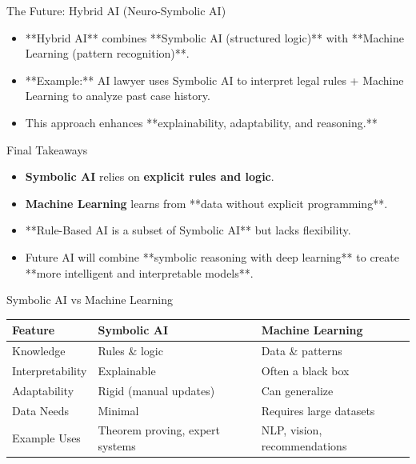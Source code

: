 \documentclass{beamer}
\begin{document}
\begin{frame}{The Future: Hybrid AI (Neuro-Symbolic AI)}
    \begin{itemize}
        \item **Hybrid AI** combines **Symbolic AI (structured logic)** with **Machine Learning (pattern recognition)**.
        \item **Example:** AI lawyer uses Symbolic AI to interpret legal rules + Machine Learning to analyze past case history.
        \item This approach enhances **explainability, adaptability, and reasoning.**
    \end{itemize}
\end{frame}

\begin{frame}{Final Takeaways}
    \begin{itemize}
        \item \textbf{Symbolic AI} relies on \textbf{explicit rules and logic}.
        \item \textbf{Machine Learning} learns from **data without explicit programming**.
        \item **Rule-Based AI is a subset of Symbolic AI** but lacks flexibility.
        \item Future AI will combine **symbolic reasoning with deep learning** to create **more intelligent and interpretable models**.
    \end{itemize}
\end{frame}

\begin{frame}{Symbolic AI vs Machine Learning}
    \begin{tcolorbox}[colback=white!95!black]
        \begin{tabularx}{\textwidth}{>{\raggedright\arraybackslash\hsize=0.8\hsize}X>{\raggedright\arraybackslash\hsize=1.1\hsize}X>{\raggedright\arraybackslash\hsize=1.1\hsize}X}
            \textbf{Feature} & \textbf{Symbolic AI} & \textbf{Machine Learning} \\
            \midrule
            Knowledge & Rules \& logic & Data \& patterns \\
            \hline
            Interpretability & Explainable & Often a black box \\
            \hline
            Adaptability & Rigid (manual updates) & Can generalize \\
            \hline
            Data Needs & Minimal & Requires large datasets \\
            \hline
            Example Uses & Theorem proving, expert systems & NLP, vision, recommendations \\
        \end{tabularx}
    \end{tcolorbox}
\end{frame}
\end{document}
